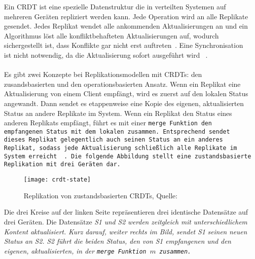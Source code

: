 %
%
Ein \gls{CRDT} ist eine spezielle Datenstruktur die in verteilten Systemen auf mehreren Geräten repliziert werden kann. Jede Operation wird an alle Replikate gesendet. Jedes Replikat wendet alle ankommenden Aktualisierungen an und ein Algorithmus löst alle konfliktbehafteten Aktualisierungen auf, wodurch sichergestellt ist, dass Konflikte gar nicht erst auftreten~\cite{crdt_shapiro}. Eine Synchronisation ist nicht notwendig, da die Aktualisierung sofort ausgeführt wird ~\cite{crdt_shapiro2}.\\\\
%
Es gibt zwei Konzepte bei Replikationsmodellen mit \glspl{CRDT}: den zusandsbasierten und den operationsbasierten Ansatz.
%
Wenn ein Replikat eine Aktualisierung von einem Client empfängt, wird es zuerst auf den lokalen Status angewandt.
Dann sendet es etappenweise eine Kopie des eigenen, aktualisierten Status an andere Replikate im System.
Wenn ein Replikat den Status eines anderen Replikats empfängt, führt es mit einer \tt{merge} Funktion den empfangenen Status mit dem lokalen zusammen.
Entsprechend sendet dieses Replikat gelegentlich auch seinen Status an ein anderes Replikat, sodass jede Aktualisierung schließlich alle Replikate im System erreicht ~\cite{crdt_shapiro2}.
Die folgende Abbildung stellt eine zustandsbasierte Replikation mit drei Geräten dar.
%
\begin{figure}[H]
  \centering
  \texttt{[image: crdt-state]}
  \grayRule
  \caption[Replikation von zustandsbasierten \glspl{CRDT}]{Replikation von zustandsbasierten \glspl{CRDT}, Quelle: ~\cite{crdt_shapiro2}}
  \label{fig:crdt-state}
\end{figure}
%
Die drei Kreise auf der linken Seite repräsentieren drei identische Datensätze auf drei Geräten. Die Datensätze \it{S1} und \it{S2} werden zeitgleich mit unterschiedlichem Kontent aktualisiert.
Kurz darauf, weiter rechts im Bild, sendet \it{S1} seinen neuen Status an \it{S2}.
\it{S2} führt die beiden Status, den von \it{S1} empfangenen und den eigenen, aktualisierten, in der \tt{merge} Funktion $m$ zusammen.
